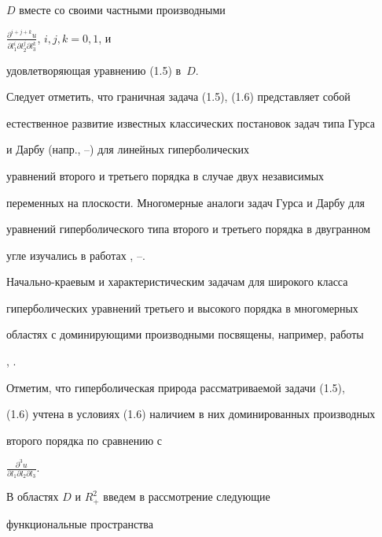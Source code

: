 $D$ вместе со своими частными производными


$\frac{\partial^{i+j+k}u}{\partial l^i_1\partial l^j_2


\partial l^k_3}$, $i,j,k=0,1$, и


удовлетворяющая уравнению (1.5) в~$D$.





Следует отметить, что граничная задача (1.5), (1.6) представляет собой


естественное развитие известных классических постановок задач типа Гурса


и Дарбу (напр., \cite{1}--\cite{4}) для линейных гиперболических


уравнений второго и третьего порядка в случае двух независимых


переменных на плоскости. Многомерные аналоги задач Гурса и Дарбу для


уравнений гиперболического типа второго и третьего порядка в двугранном


угле изучались в работах \cite{2}, \cite{5}--\cite{7}.





Начально-краевым и характеристическим задачам для широкого класса


гиперболических уравнений третьего и высокого порядка в многомерных


областях с доминирующими производными посвящены, например, работы


\cite{8}, \cite{9}.





\begin{notes}


Отметим, что гиперболическая природа рассматриваемой задачи (1.5),


(1.6) учтена в условиях (1.6) наличием в них доминированных производных


второго порядка по сравнению с


$\frac{\partial^3u}{\partial l_1\partial l_2\partial l_3}$.


\end{notes}





В областях $D$ и $R^2_+$ введем в рассмотрение следующие


функциональные пространства


